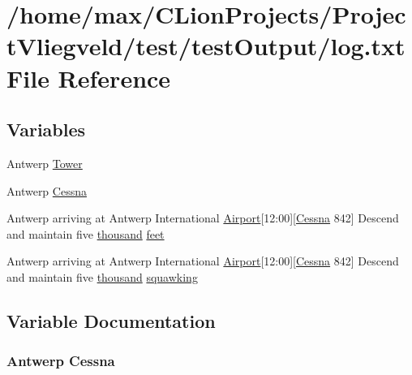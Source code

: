 \hypertarget{test_2testOutput_2log_8txt}{}\section{/home/max/\+C\+Lion\+Projects/\+Project\+Vliegveld/test/test\+Output/log.txt File Reference}
\label{test_2testOutput_2log_8txt}
\subsection*{Variables}
\begin{DoxyCompactItemize}
\item 
Antwerp \hyperlink{test_2testOutput_2log_8txt_ade5c2a9317c664c53d015e41bdc32393}{Tower}
\item 
Antwerp \hyperlink{test_2testOutput_2log_8txt_a3de326468ae3f37941c91ae68853a1af}{Cessna}
\item 
Antwerp arriving at Antwerp International \hyperlink{classAirport}{Airport}\mbox{[}12\+:00\mbox{]}\mbox{[}\hyperlink{test_2testOutput_2log_8txt_a3de326468ae3f37941c91ae68853a1af}{Cessna} 842\mbox{]} Descend and maintain five \hyperlink{happyDay5ExpectedATC_8txt_a429913a0643fe14faca3dca538caa7bb}{thousand} \hyperlink{test_2testOutput_2log_8txt_ab05f43b034caaa12636100a9769529ca}{feet}
\item 
Antwerp arriving at Antwerp International \hyperlink{classAirport}{Airport}\mbox{[}12\+:00\mbox{]}\mbox{[}\hyperlink{test_2testOutput_2log_8txt_a3de326468ae3f37941c91ae68853a1af}{Cessna} 842\mbox{]} Descend and maintain five \hyperlink{happyDay5ExpectedATC_8txt_a429913a0643fe14faca3dca538caa7bb}{thousand} \hyperlink{test_2testOutput_2log_8txt_a890147ec88e2d9518adf949981616843}{squawking}
\end{DoxyCompactItemize}


\subsection{Variable Documentation}
\subsubsection[{\texorpdfstring{Cessna}{Cessna}}]{\setlength{\rightskip}{0pt plus 5cm}Antwerp Cessna}\hypertarget{test_2testOutput_2log_8txt_a3de326468ae3f37941c91ae68853a1af}{}\label{test_2testOutput_2log_8txt_a3de326468ae3f37941c91ae68853a1af}
